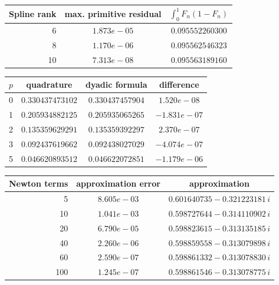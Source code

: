 \begin{tabular}{rcc}
\toprule
Spline rank & max. primitive residual & $\int_0^1F_n(1-F_n)$\\
\midrule
6 & $1.873e-05$ & $0.095552260300$\\
8 & $1.170e-06$ & $0.095562546323$\\
10 & $7.313e-08$ & $0.095563189160$\\
\bottomrule
\end{tabular}
\par\medskip
\begin{tabular}{rccc}
\toprule
$p$ & quadrature & dyadic formula & difference\\
\midrule
0 & $0.330437473102$ & $0.330437457904$ & $1.520e-08$\\
1 & $0.205934882125$ & $0.205935065265$ & $-1.831e-07$\\
2 & $0.135359629291$ & $0.135359392297$ & $2.370e-07$\\
3 & $0.092437619662$ & $0.092438027029$ & $-4.074e-07$\\
5 & $0.046620893512$ & $0.046622072851$ & $-1.179e-06$\\
\bottomrule
\end{tabular}
\par\medskip
\begin{tabular}{rcc}
\toprule
Newton terms & approximation error & approximation\\
\midrule
5 & $8.605e-03$ & $0.601640735-0.321223181\,i$\\
10 & $1.041e-03$ & $0.598727644-0.314110902\,i$\\
20 & $6.790e-05$ & $0.598823615-0.313135185\,i$\\
40 & $2.260e-06$ & $0.598859558-0.313079898\,i$\\
60 & $2.590e-07$ & $0.598861332-0.313078830\,i$\\
100 & $1.245e-07$ & $0.598861546-0.313078775\,i$\\
\bottomrule
\end{tabular}
